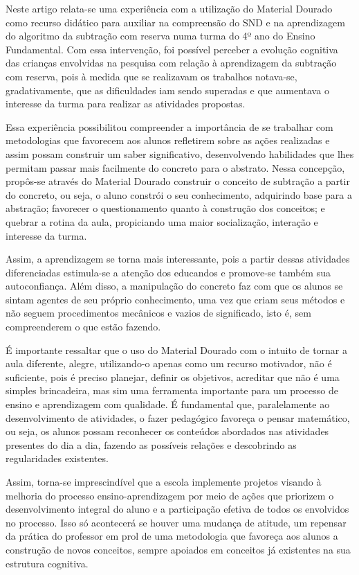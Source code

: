 \begin{refsection}
    Neste artigo relata-se uma experiência com a utilização do Material Dourado como recurso didático para auxiliar na compreensão do SND e na aprendizagem do algoritmo da subtração com reserva numa turma do 4º ano do Ensino Fundamental. Com essa intervenção, foi possível perceber a evolução cognitiva das crianças envolvidas na pesquisa com relação à aprendizagem da subtração com reserva, pois à medida que se realizavam os trabalhos notava-se, gradativamente, que as dificuldades iam sendo superadas e que aumentava o interesse da turma para realizar as atividades propostas.  

    Essa experiência possibilitou compreender a importância de se trabalhar com metodologias que favorecem aos alunos refletirem sobre as ações realizadas e assim possam construir um saber significativo, desenvolvendo habilidades que lhes permitam passar mais facilmente do concreto para o abstrato. Nessa concepção, propôs-se através do Material Dourado construir o conceito de subtração a partir do concreto, ou seja, o aluno constrói o seu conhecimento, adquirindo base para a abstração; favorecer o questionamento quanto à construção dos conceitos; e quebrar a rotina da aula, propiciando uma maior socialização, interação e interesse da turma.  

    Assim, a aprendizagem se torna mais interessante, pois a partir dessas atividades diferenciadas estimula-se a atenção dos educandos e promove-se também sua autoconfiança. Além disso, a manipulação do concreto faz com que os alunos se sintam agentes de seu próprio conhecimento, uma vez que criam seus métodos e não seguem procedimentos mecânicos e vazios de significado, isto é, sem compreenderem o que estão fazendo. 

    É importante ressaltar que o uso do Material Dourado com o intuito de tornar a aula diferente, alegre, utilizando-o apenas como um recurso motivador, não é suficiente, pois é preciso planejar, definir os objetivos, acreditar que não é uma simples brincadeira, mas sim uma ferramenta importante para um processo de ensino e aprendizagem com qualidade. É fundamental que, paralelamente ao desenvolvimento de atividades, o fazer pedagógico favoreça o pensar matemático, ou seja, os alunos possam reconhecer os conteúdos abordados nas atividades presentes do dia a dia, fazendo as possíveis relações e descobrindo as regularidades existentes.  

    Assim, torna-se imprescindível que a escola implemente projetos visando à melhoria do processo ensino-aprendizagem por meio de ações que priorizem o desenvolvimento integral do aluno e a participação efetiva de todos os envolvidos no processo. Isso só acontecerá se houver uma mudança de atitude, um repensar da prática do professor em prol de uma metodologia que favoreça aos alunos a construção de novos conceitos, sempre apoiados em conceitos já existentes na sua estrutura cognitiva.  


\end{refsection}
